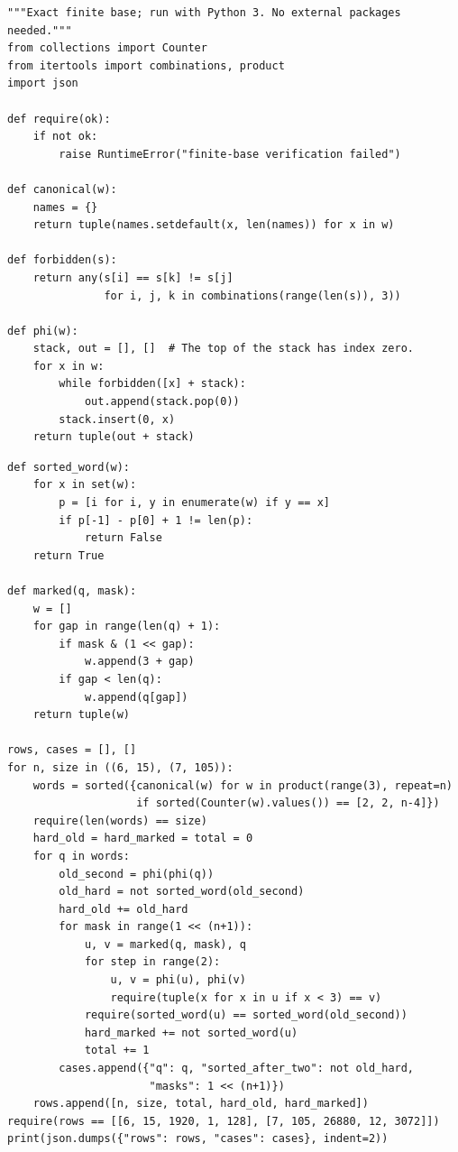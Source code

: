 \documentclass[11pt,a4paper]{article}
\begin{document}
{\footnotesize
\begin{verbatim}
"""Exact finite base; run with Python 3. No external packages needed."""
from collections import Counter
from itertools import combinations, product
import json

def require(ok):
    if not ok:
        raise RuntimeError("finite-base verification failed")

def canonical(w):
    names = {}
    return tuple(names.setdefault(x, len(names)) for x in w)

def forbidden(s):
    return any(s[i] == s[k] != s[j]
               for i, j, k in combinations(range(len(s)), 3))

def phi(w):
    stack, out = [], []  # The top of the stack has index zero.
    for x in w:
        while forbidden([x] + stack):
            out.append(stack.pop(0))
        stack.insert(0, x)
    return tuple(out + stack)
\end{verbatim}
}
\newpage
{\footnotesize
\begin{verbatim}
def sorted_word(w):
    for x in set(w):
        p = [i for i, y in enumerate(w) if y == x]
        if p[-1] - p[0] + 1 != len(p):
            return False
    return True

def marked(q, mask):
    w = []
    for gap in range(len(q) + 1):
        if mask & (1 << gap):
            w.append(3 + gap)
        if gap < len(q):
            w.append(q[gap])
    return tuple(w)

rows, cases = [], []
for n, size in ((6, 15), (7, 105)):
    words = sorted({canonical(w) for w in product(range(3), repeat=n)
                    if sorted(Counter(w).values()) == [2, 2, n-4]})
    require(len(words) == size)
    hard_old = hard_marked = total = 0
    for q in words:
        old_second = phi(phi(q))
        old_hard = not sorted_word(old_second)
        hard_old += old_hard
        for mask in range(1 << (n+1)):
            u, v = marked(q, mask), q
            for step in range(2):
                u, v = phi(u), phi(v)
                require(tuple(x for x in u if x < 3) == v)
            require(sorted_word(u) == sorted_word(old_second))
            hard_marked += not sorted_word(u)
            total += 1
        cases.append({"q": q, "sorted_after_two": not old_hard,
                      "masks": 1 << (n+1)})
    rows.append([n, size, total, hard_old, hard_marked])
require(rows == [[6, 15, 1920, 1, 128], [7, 105, 26880, 12, 3072]])
print(json.dumps({"rows": rows, "cases": cases}, indent=2))
\end{verbatim}
}



\end{document}
